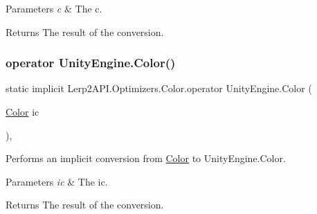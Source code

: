 \begin{DoxyParams}{Parameters}
{\em c} & The c.\\
\hline
\end{DoxyParams}
\begin{DoxyReturn}{Returns}
The result of the conversion.
\end{DoxyReturn}
\mbox{\label{struct_lerp2_a_p_i_1_1_optimizers_1_1_color_ab441222f8fa3ecfa62d4413aec7a1860}} 
\subsubsection{\texorpdfstring{operator Unity\+Engine.\+Color()}{operator UnityEngine.Color()}}
{\footnotesize\ttfamily static implicit Lerp2\+A\+P\+I.\+Optimizers.\+Color.\+operator Unity\+Engine.\+Color (\begin{DoxyParamCaption}\item[{\hyperlink{struct_lerp2_a_p_i_1_1_optimizers_1_1_color}{Color}}]{ic }\end{DoxyParamCaption})\hspace{0.3cm}{\ttfamily [inline]}, {\ttfamily [static]}}



Performs an implicit conversion from \hyperlink{struct_lerp2_a_p_i_1_1_optimizers_1_1_color}{Color} to Unity\+Engine.\+Color. 


\begin{DoxyParams}{Parameters}
{\em ic} & The ic.\\
\hline
\end{DoxyParams}
\begin{DoxyReturn}{Returns}
The result of the conversion.
\end{DoxyReturn}
\mbox{\label{struct_lerp2_a_p_i_1_1_optimizers_1_1_color_a79bcf4f099d008bd3dacf5e81d81fa42}} 
